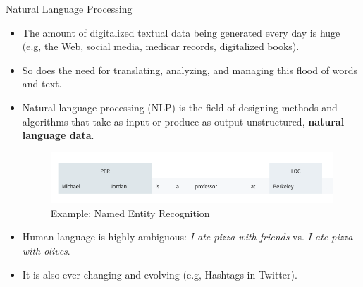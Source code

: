 \documentclass[handout]{beamer}
\begin{document}
\begin{frame}{Natural Language Processing}
\begin{scriptsize}
\begin{itemize}

\item The amount of digitalized textual data being generated every day is huge (e.g, the Web, social media, medicar records, digitalized books).

\item So does the need for translating, analyzing, and managing this flood of words and text.

\item Natural language processing (NLP) is the field of designing methods and algorithms that take as input or produce as output unstructured, \textbf{natural language data}. \cite{goldberg2017neural}

     \begin{figure}[h]
        	\includegraphics[scale = 0.4]{pics/NER.png}
        	\caption{Example: Named Entity Recognition}
        \end{figure}

\item Human language is highly ambiguous: \emph{I ate pizza with friends} vs. \emph{I ate pizza with olives}.

\item It is also ever changing and evolving (e.g, Hashtags in Twitter). 

\end{itemize}
\end{scriptsize}
\end{frame}
\end{document}
